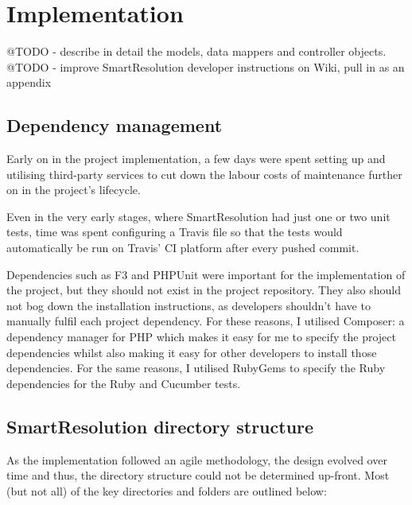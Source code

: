 \chapter{Implementation}

@TODO - describe in detail the models, data mappers and controller objects.
@TODO - improve SmartResolution developer instructions on Wiki, pull in as an appendix

\section{Dependency management}

Early on in the project implementation, a few days were spent setting up and utilising third-party services to cut down the labour costs of maintenance further on in the project's lifecycle.

Even in the very early stages, where SmartResolution had just one or two unit tests, time was spent configuring a Travis file so that the tests would automatically be run on Travis' CI platform after every pushed commit.

Dependencies such as F3 and PHPUnit were important for the implementation of the project, but they should not exist in the project repository. They also should not bog down the installation instructions, as developers shouldn't have to manually fulfil each project dependency. For these reasons, I utilised Composer: a dependency manager for PHP which makes it easy for me to specify the project dependencies whilst also making it easy for other developers to install those dependencies. For the same reasons, I utilised RubyGems to specify the Ruby dependencies for the Ruby and Cucumber tests.

\section{SmartResolution directory structure}

As the implementation followed an agile methodology, the design evolved over time and thus, the directory structure could not be determined up-front. Most (but not all) of the key directories and folders are outlined below:

\begin{minipage}{\textwidth}
\end{minipage}

